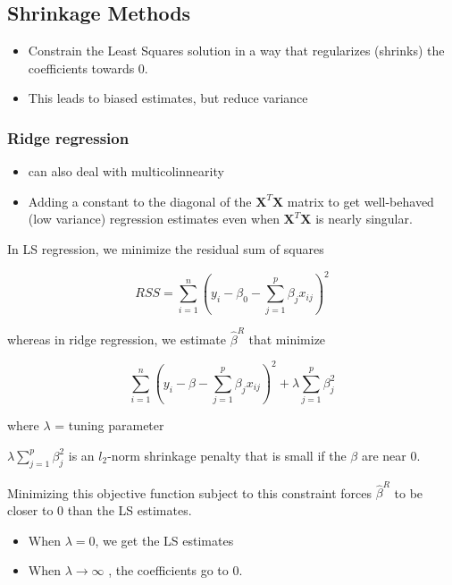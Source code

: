 \documentclass[
]{book}
\begin{document}
\hypertarget{shrinkage-methods}{%
\subsection{Shrinkage Methods}\label{shrinkage-methods}}

\begin{itemize}
\item
  Constrain the Least Squares solution in a way that regularizes (shrinks) the coefficients towards 0.
\item
  This leads to biased estimates, but reduce variance
\end{itemize}

\hypertarget{ridge-regression}{%
\subsubsection{Ridge regression}\label{ridge-regression}}

\begin{itemize}
\item
  can also deal with multicolinnearity
\item
  Adding a constant to the diagonal of the \(\mathbf{X}^T \mathbf{X}\) matrix to get well-behaved (low variance) regression estimates even when \(\mathbf{X}^T \mathbf{X}\) is nearly singular.
\end{itemize}

In LS regression, we minimize the residual sum of squares

\[
RSS = \sum_{i=1}^n(y_i - \beta_0 - \sum_{j=1}^p \beta_j x_{ij})^2
\]

whereas in ridge regression, we estimate \(\hat{\beta}^R\) that minimize

\[
\sum_{i=1}^n (y_i- \beta - \sum_{j=1}^p \beta_j x_{ij})^2 + \lambda \sum_{j=1}^p \beta_j^2
\]

where \(\lambda\) = tuning parameter

\(\lambda \sum_{j=1}^p \beta_j^2\) is an \(l_2\)-norm shrinkage penalty that is small if the \(\beta\) are near 0.

Minimizing this objective function subject to this constraint forces \(\hat{\beta}^R\) to be closer to 0 than the LS estimates.

\begin{itemize}
\item
  When \(\lambda = 0\), we get the LS estimates
\item
  When \(\lambda \to \infty\) , the coefficients go to 0.
\end{itemize}
\end{document}
